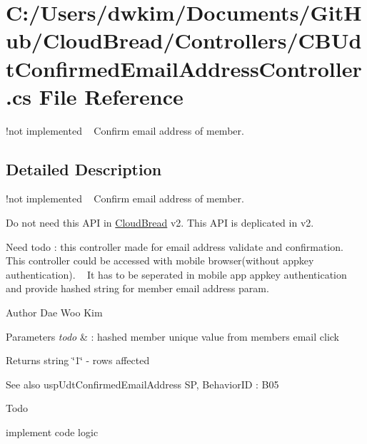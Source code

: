 \hypertarget{a00155}{}\section{C\+:/\+Users/dwkim/\+Documents/\+Git\+Hub/\+Cloud\+Bread/\+Controllers/\+C\+B\+Udt\+Confirmed\+Email\+Address\+Controller.cs File Reference}
\label{a00155}


!not implemented ~\newline
Confirm email address of member. ~\newline
 




\subsection{Detailed Description}
!not implemented ~\newline
Confirm email address of member. ~\newline


Do not need this A\+PI in \hyperlink{a00217}{Cloud\+Bread} v2. This A\+PI is deplicated in v2.

Need todo \+: this controller made for email address validate and confirmation. ~\newline
This controller could be accessed with mobile browser(without appkey authentication). ~\newline
It has to be seperated in mobile app appkey authentication and provide hashed string for member email address param. ~\newline
 \begin{DoxyAuthor}{Author}
Dae Woo Kim 
\end{DoxyAuthor}

\begin{DoxyParams}{Parameters}
{\em todo} & \+: hashed member unique value from member\textquotesingle{}s email click \\
\hline
\end{DoxyParams}
\begin{DoxyReturn}{Returns}
string \char`\"{}1\char`\"{} -\/ rows affected 
\end{DoxyReturn}
\begin{DoxySeeAlso}{See also}
usp\+Udt\+Confirmed\+Email\+Address SP, Behavior\+ID \+: B05 
\end{DoxySeeAlso}
\begin{DoxyRefDesc}{Todo}
\item[\hyperlink{a00001__todo000019}{Todo}]implement code logic \end{DoxyRefDesc}
